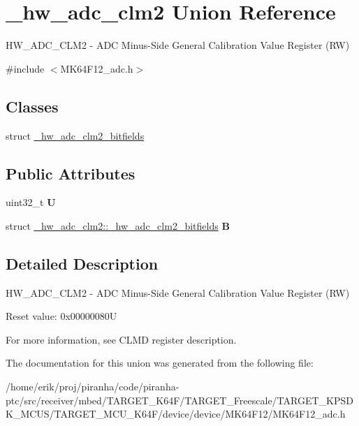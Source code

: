 \hypertarget{union__hw__adc__clm2}{}\section{\+\_\+hw\+\_\+adc\+\_\+clm2 Union Reference}
\label{union__hw__adc__clm2}


H\+W\+\_\+\+A\+D\+C\+\_\+\+C\+L\+M2 -\/ A\+DC Minus-\/\+Side General Calibration Value Register (RW)  




{\ttfamily \#include $<$M\+K64\+F12\+\_\+adc.\+h$>$}

\subsection*{Classes}
\begin{DoxyCompactItemize}
\item 
struct \hyperlink{struct__hw__adc__clm2_1_1__hw__adc__clm2__bitfields}{\+\_\+hw\+\_\+adc\+\_\+clm2\+\_\+bitfields}
\end{DoxyCompactItemize}
\subsection*{Public Attributes}
\begin{DoxyCompactItemize}
\item 
uint32\+\_\+t {\bfseries U}\hypertarget{union__hw__adc__clm2_a778bbea0fa51ecda003e8b9e51f3390e}{}\label{union__hw__adc__clm2_a778bbea0fa51ecda003e8b9e51f3390e}

\item 
struct \hyperlink{struct__hw__adc__clm2_1_1__hw__adc__clm2__bitfields}{\+\_\+hw\+\_\+adc\+\_\+clm2\+::\+\_\+hw\+\_\+adc\+\_\+clm2\+\_\+bitfields} {\bfseries B}\hypertarget{union__hw__adc__clm2_aee73b446f976031095f37e63981324e7}{}\label{union__hw__adc__clm2_aee73b446f976031095f37e63981324e7}

\end{DoxyCompactItemize}


\subsection{Detailed Description}
H\+W\+\_\+\+A\+D\+C\+\_\+\+C\+L\+M2 -\/ A\+DC Minus-\/\+Side General Calibration Value Register (RW) 

Reset value\+: 0x00000080U

For more information, see C\+L\+MD register description. 

The documentation for this union was generated from the following file\+:\begin{DoxyCompactItemize}
\item 
/home/erik/proj/piranha/code/piranha-\/ptc/src/receiver/mbed/\+T\+A\+R\+G\+E\+T\+\_\+\+K64\+F/\+T\+A\+R\+G\+E\+T\+\_\+\+Freescale/\+T\+A\+R\+G\+E\+T\+\_\+\+K\+P\+S\+D\+K\+\_\+\+M\+C\+U\+S/\+T\+A\+R\+G\+E\+T\+\_\+\+M\+C\+U\+\_\+\+K64\+F/device/device/\+M\+K64\+F12/M\+K64\+F12\+\_\+adc.\+h\end{DoxyCompactItemize}
